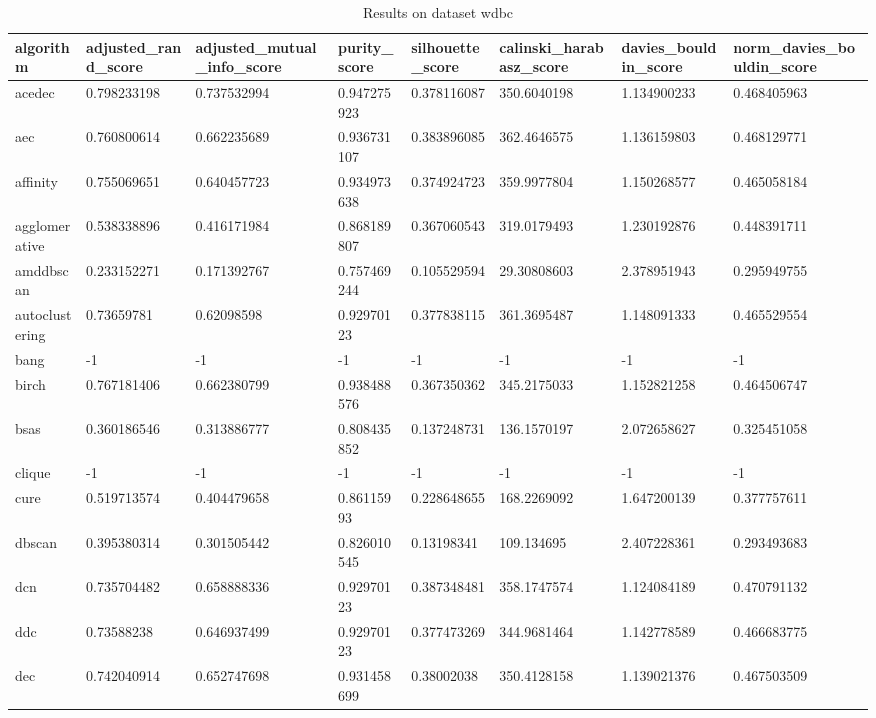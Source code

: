 \begin{table}[H]
\centering
\caption{Results on dataset wdbc}
\label{tab:params:wdbc}
\begin{tabular}{|l|l|l|l|l|l|l|l|}
\hline
algorithm & adjusted\_rand\_score & adjusted\_mutual\_info\_score & purity\_score & silhouette\_score & calinski\_harabasz\_score & davies\_bouldin\_score & norm\_davies\_bouldin\_score \\
\hline
acedec & 0.798233198 & 0.737532994 & 0.947275923 & 0.378116087 & 350.6040198 & 1.134900233 & 0.468405963 \\
\hline
aec & 0.760800614 & 0.662235689 & 0.936731107 & 0.383896085 & 362.4646575 & 1.136159803 & 0.468129771 \\
\hline
affinity & 0.755069651 & 0.640457723 & 0.934973638 & 0.374924723 & 359.9977804 & 1.150268577 & 0.465058184 \\
\hline
agglomerative & 0.538338896 & 0.416171984 & 0.868189807 & 0.367060543 & 319.0179493 & 1.230192876 & 0.448391711 \\
\hline
amddbscan & 0.233152271 & 0.171392767 & 0.757469244 & 0.105529594 & 29.30808603 & 2.378951943 & 0.295949755 \\
\hline
autoclustering & 0.73659781 & 0.62098598 & 0.92970123 & 0.377838115 & 361.3695487 & 1.148091333 & 0.465529554 \\
\hline
bang & -1 & -1 & -1 & -1 & -1 & -1 & -1 \\
\hline
birch & 0.767181406 & 0.662380799 & 0.938488576 & 0.367350362 & 345.2175033 & 1.152821258 & 0.464506747 \\
\hline
bsas & 0.360186546 & 0.313886777 & 0.808435852 & 0.137248731 & 136.1570197 & 2.072658627 & 0.325451058 \\
\hline
clique & -1 & -1 & -1 & -1 & -1 & -1 & -1 \\
\hline
cure & 0.519713574 & 0.404479658 & 0.86115993 & 0.228648655 & 168.2269092 & 1.647200139 & 0.377757611 \\
\hline
dbscan & 0.395380314 & 0.301505442 & 0.826010545 & 0.13198341 & 109.134695 & 2.407228361 & 0.293493683 \\
\hline
dcn & 0.735704482 & 0.658888336 & 0.92970123 & 0.387348481 & 358.1747574 & 1.124084189 & 0.470791132 \\
\hline
ddc & 0.73588238 & 0.646937499 & 0.92970123 & 0.377473269 & 344.9681464 & 1.142778589 & 0.466683775 \\
\hline
dec & 0.742040914 & 0.652747698 & 0.931458699 & 0.38002038 & 350.4128158 & 1.139021376 & 0.467503509 \\

\end{tabular}
\end{table}
